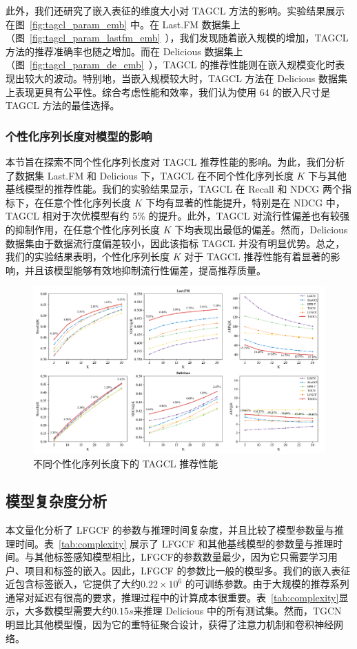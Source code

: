 此外，我们还研究了嵌入表征的维度大小对 TAGCL 方法的影响。实验结果展示在图~\ref{fig:tagcl_param_emb} 中。在 Last.FM 数据集上（图~\ref{fig:tagcl_param_lastfm_emb}~），我们发现随着嵌入规模的增加，TAGCL 方法的推荐准确率也随之增加。而在 Delicious 数据集上（图~\ref{fig:tagcl_param_de_emb}~），TAGCL 的推荐性能则在嵌入规模变化时表现出较大的波动。特别地，当嵌入规模较大时，TAGCL 方法在 Delicious 数据集上表现更具有公平性。综合考虑性能和效率，我们认为使用 64 的嵌入尺寸是 TAGCL 方法的最佳选择。

\subsubsection{个性化序列长度对模型的影响}
本节旨在探索不同个性化序列长度对 TAGCL 推荐性能的影响。为此，我们分析了数据集 Last.FM 和 Delicious 下，TAGCL 在不同个性化序列长度 $K$ 下与其他基线模型的推荐性能。我们的实验结果显示，TAGCL 在 Recall 和 NDCG 两个指标下，在任意个性化序列长度 $K$ 下均有显著的性能提升，特别是在 NDCG 中，TAGCL 相对于次优模型有约 5\% 的提升。此外，TAGCL 对流行性偏差也有较强的抑制作用，在任意个性化序列长度 $K$ 下均表现出最低的偏差。然而，Delicious 数据集由于数据流行度偏差较小，因此该指标 TAGCL 并没有明显优势。总之，我们的实验结果表明，个性化序列长度 $K$ 对于 TAGCL 推荐性能有着显著的影响，并且该模型能够有效地抑制流行性偏差，提高推荐质量。
\begin{figure}[!h]
  \centering
  \includegraphics[width=1\linewidth]{figure/topk_comparison.pdf}
  \caption{不同个性化序列长度下的 TAGCL 推荐性能}
  \label{fig:topk}
\end{figure}

\subsection{模型复杂度分析}
本文量化分析了 LFGCF 的参数与推理时间复杂度，并且比较了模型参数量与推理时间。表~\ref{tab:complexity} 展示了 LFGCF 和其他基线模型的参数量与推理时间。与其他标签感知模型相比，LFGCF的参数数量最少，因为它只需要学习用户、项目和标签的嵌入。因此，LFGCF 的参数比一般的模型多。我们的嵌入表征近包含标签嵌入，它提供了大约$0.22 \times 10^6$ 的可训练参数。由于大规模的推荐系列通常对延迟有很高的要求，推理过程中的计算成本很重要。表~\ref{tab:complexity}显示，大多数模型需要大约$0.15s$来推理 Delicious 中的所有测试集。然而，TGCN 明显比其他模型慢，因为它的重特征聚合设计，获得了注意力机制和卷积神经网络。


